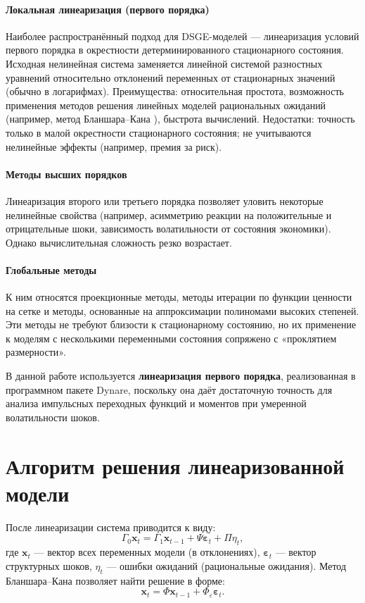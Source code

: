 \documentclass[12pt,a4paper]{report}   %
\begin{document}
        \paragraph*{Локальная линеаризация (первого порядка)}
        Наиболее распространённый подход для DSGE-моделей — линеаризация условий первого порядка в окрестности детерминированного стационарного состояния. Исходная нелинейная система заменяется линейной системой разностных уравнений относительно отклонений переменных от стационарных значений (обычно в логарифмах). Преимущества: относительная простота, возможность применения методов решения линейных моделей рациональных ожиданий (например, метод Бланшара–Кана \cite{blanchardkahn}), быстрота вычислений. Недостатки: точность только в малой окрестности стационарного состояния; не учитываются нелинейные эффекты (например, премия за риск).

        \paragraph*{Методы высших порядков}
        Линеаризация второго или третьего порядка позволяет уловить некоторые нелинейные свойства (например, асимметрию реакции на положительные и отрицательные шоки, зависимость волатильности от состояния экономики). Однако вычислительная сложность резко возрастает.

        \paragraph*{Глобальные методы}
        К ним относятся проекционные методы, методы итерации по функции ценности на сетке и методы, основанные на аппроксимации полиномами высоких степеней. Эти методы не требуют близости к стационарному состоянию, но их применение к моделям с несколькими переменными состояния сопряжено с «проклятием размерности».

        В данной работе используется \textbf{линеаризация первого порядка}, реализованная в программном пакете Dynare, поскольку она даёт достаточную точность для анализа импульсных переходных функций и моментов при умеренной волатильности шоков.
        
        \section{Алгоритм решения линеаризованной модели}

        После линеаризации система приводится к виду:
        \[
        \Gamma_0 \mathbf{x}_t = \Gamma_1 \mathbf{x}_{t-1} + \Psi \boldsymbol{\varepsilon}_t + \Pi \eta_t,
        \]
        где $\mathbf{x}_t$ — вектор всех переменных модели (в отклонениях), $\boldsymbol{\varepsilon}_t$ — вектор структурных шоков, $\eta_t$ — ошибки ожиданий (рациональные ожидания). Метод Бланшара–Кана позволяет найти решение в форме:
        \[
        \mathbf{x}_t = \Phi \mathbf{x}_{t-1} + \Phi_{\varepsilon} \boldsymbol{\varepsilon}_t.
        \]
\end{document}
